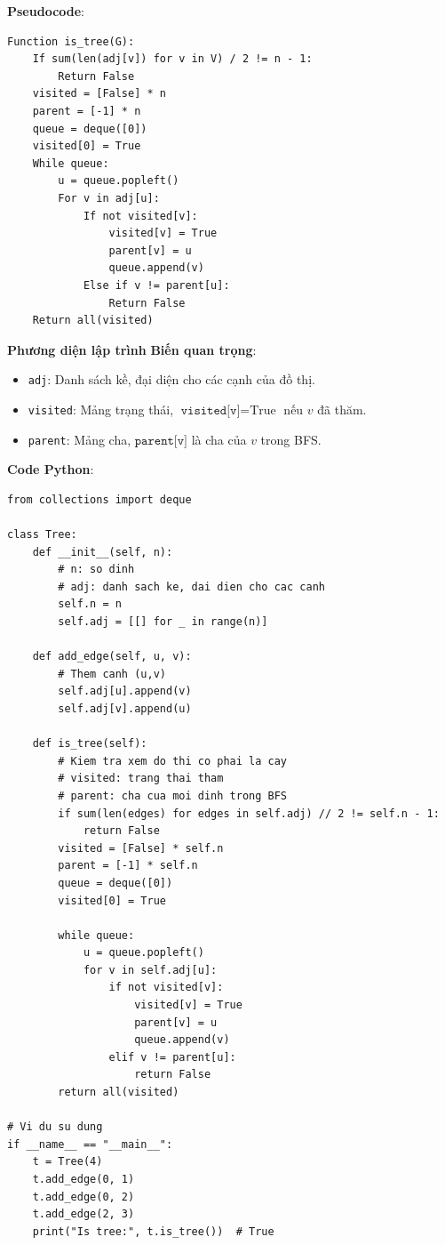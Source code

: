 \documentclass[a4paper,12pt]{article}
\begin{document}
\textbf{Pseudocode}:
\begin{verbatim}
Function is_tree(G):
    If sum(len(adj[v]) for v in V) / 2 != n - 1:
        Return False
    visited = [False] * n
    parent = [-1] * n
    queue = deque([0])
    visited[0] = True
    While queue:
        u = queue.popleft()
        For v in adj[u]:
            If not visited[v]:
                visited[v] = True
                parent[v] = u
                queue.append(v)
            Else if v != parent[u]:
                Return False
    Return all(visited)
\end{verbatim}

\textbf{Phương diện lập trình}
\textbf{Biến quan trọng}:
\begin{itemize}
    \item \texttt{adj}: Danh sách kề, đại diện cho các cạnh của đồ thị.
    \item \texttt{visited}: Mảng trạng thái, \( \texttt{visited[v]} = \text{True} \) nếu \( v \) đã thăm.
    \item \texttt{parent}: Mảng cha, \( \texttt{parent[v]} \) là cha của \( v \) trong BFS.
\end{itemize}

\textbf{Code Python}:
\lstset{language=Python}
\begin{lstlisting}
from collections import deque

class Tree:
    def __init__(self, n):
        # n: so dinh
        # adj: danh sach ke, dai dien cho cac canh
        self.n = n
        self.adj = [[] for _ in range(n)]

    def add_edge(self, u, v):
        # Them canh (u,v)
        self.adj[u].append(v)
        self.adj[v].append(u)

    def is_tree(self):
        # Kiem tra xem do thi co phai la cay
        # visited: trang thai tham
        # parent: cha cua moi dinh trong BFS
        if sum(len(edges) for edges in self.adj) // 2 != self.n - 1:
            return False
        visited = [False] * self.n
        parent = [-1] * self.n
        queue = deque([0])
        visited[0] = True

        while queue:
            u = queue.popleft()
            for v in self.adj[u]:
                if not visited[v]:
                    visited[v] = True
                    parent[v] = u
                    queue.append(v)
                elif v != parent[u]:
                    return False
        return all(visited)

# Vi du su dung
if __name__ == "__main__":
    t = Tree(4)
    t.add_edge(0, 1)
    t.add_edge(0, 2)
    t.add_edge(2, 3)
    print("Is tree:", t.is_tree())  # True
\end{lstlisting}
\end{document}
